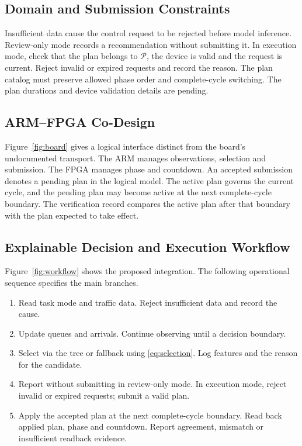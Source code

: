 \subsection{Domain and Submission Constraints}
Insufficient data cause the control request to be rejected before model inference. Review-only mode records a recommendation without submitting it. In execution mode, check that the plan belongs to $\mathcal P$, the device is valid and the request is current. Reject invalid or expired requests and record the reason. The plan catalog must preserve allowed phase order and complete-cycle switching. The plan durations and device validation details are pending.

\subsection{ARM--FPGA Co-Design}
Figure~\ref{fig:board} gives a logical interface distinct from the board's undocumented transport. The ARM manages observations, selection and submission. The FPGA manages phase and countdown. An accepted submission denotes a pending plan in the logical model. The active plan governs the current cycle, and the pending plan may become active at the next complete-cycle boundary. The verification record compares the active plan after that boundary with the plan expected to take effect.



\subsection{Explainable Decision and Execution Workflow}
Figure~\ref{fig:workflow} shows the proposed integration. The following operational sequence specifies the main branches.
\begin{enumerate}
\item Read task mode and traffic data. Reject insufficient data and record the cause.
\item Update queues and arrivals. Continue observing until a decision boundary.
\item Select via the tree or fallback using \eqref{eq:selection}. Log features and the reason for the candidate.
\item Report without submitting in review-only mode. In execution mode, reject invalid or expired requests; submit a valid plan.
\item Apply the accepted plan at the next complete-cycle boundary. Read back applied plan, phase and countdown. Report agreement, mismatch or insufficient readback evidence.
\end{enumerate}

